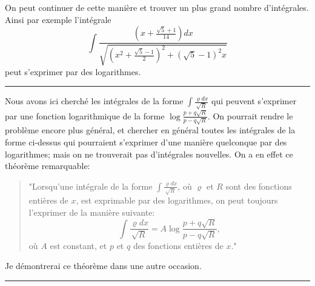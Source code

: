 \documentclass[oneside, 12 pt, leqno]{memoir}
\begin{document}
On peut continuer de cette manière et trouver un plus grand nombre d'intégrales. Ainsi par exemple l'intégrale
\[\int \frac{\left(x+\frac{\sqrt{5}+1}{14}\right) d x}{\sqrt{\left(x^2+\frac{\sqrt{5}-1}{2}\right)^2+(\sqrt{5}-1)^2 x}}\]
peut s'exprimer par des logarithmes.
\begin{center}\rule{2in}{0.1pt}\end{center}

Nous avons ici cherché les intégrales de la forme \(\int \frac{\varrho dx}{\sqrt{R}}\) qui peuvent s'exprimer par une fonction logarithmique de la forme \(\log \frac{p+q \sqrt{R}}{p-q \sqrt{R}}\). On pourrait rendre le problème encore plus général, et chercher en général toutes les intégrales de la forme ci-dessus qui pourraient s'exprimer d'une manière quelconque par des logarithmes; mais on ne trouverait pas d'intégrales nouvelles. On a en effet ce théorème remarquable:

\begin{quote}"Lorsqu'une intégrale de la forme \(\int \frac{\varrho d x}{\sqrt{R}}\), où \(\varrho\) et \(R\) sont des fonctions entières de \(x\), est exprimable par des logarithmes, on peut toujours l'exprimer de la manière suivante:
\[\int \frac{\varrho d x}{\sqrt{R}}=A \log \frac{p+q \sqrt{R}}{p-q \sqrt{R}},\]
où \(A\) est constant, et \(p\) et \(q\) des fonctions entières de \(x\)." \end{quote}

Je démontrerai ce théorème dans une autre occasion.

\begin{center}\rule{2in}{0.1pt}\end{center}
\vfill
\end{document}
